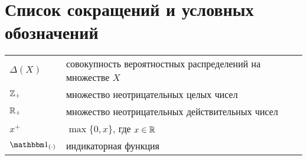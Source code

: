\chapter*{Список сокращений и условных обозначений}             %



\begin{tabular}{p{3cm}p{12.5cm}}
  $\Delta(X)$ & совокупность вероятностных распределений на множестве $X$ \\
  $\mathbb{Z}_+$ & множество неотрицательных целых чисел \\
  $\mathbb{R}_+$ & множество неотрицательных действительных чисел \\
  $x^+$ & $\max\{0, x\}$, где $x \in \mathbb{R}$ \\
  $\Ind_{(\cdot)}$ & индикаторная функция
\end{tabular}

